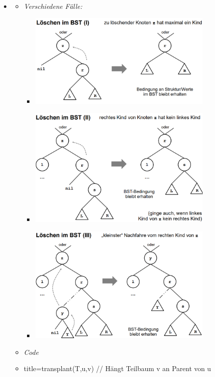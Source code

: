 \documentclass[
    12pt,
    a4paper,
    ngerman,
    color=3b,%
    marginpar=false,
    colorback=false,
    leqno,
]{tudaexercise}
\begin{document}
\begin{itemize}
    \item {}
          \begin{itemize}
              \item \textit{Verschiedene Fälle:}
                    \begin{itemize}
                        \item[] \includegraphics[width=9cm]{pictures/binärerSuchbaumLöschen1.PNG}
                        \item[] \includegraphics[width=9cm]{pictures/binärerSuchbaumLöschen2.PNG}
                        \item[] \includegraphics[width=9cm]{pictures/binärerSuchbaumLöschen3.PNG}
                    \end{itemize}
                    \clearpage
              \item \textit{Code}
              \item[]
                        \begin{ccode}[autogobble]{title={transplant(T,u,v) // Hängt Teilbaum v an Parent von u}}

\end{ccode}
\end{itemize}
\end{itemize}
\end{document}
